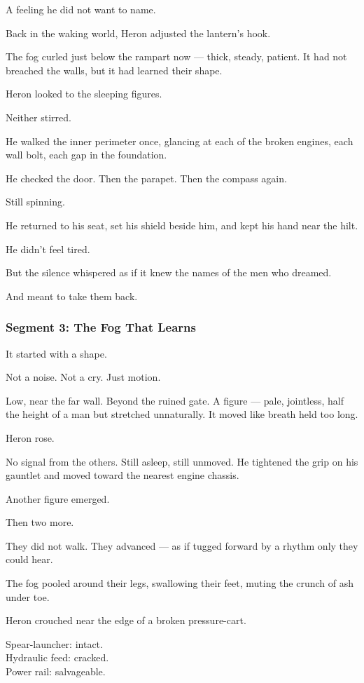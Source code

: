 \documentclass[9pt]{article}
\begin{document}
A feeling he did not want to name.

\bigskip

Back in the waking world, Heron adjusted the lantern’s hook.

The fog curled just below the rampart now — thick, steady, patient. It had not breached the walls, but it had learned their shape.

Heron looked to the sleeping figures.

Neither stirred.

He walked the inner perimeter once, glancing at each of the broken engines, each wall bolt, each gap in the foundation.

He checked the door. Then the parapet. Then the compass again.

Still spinning.

He returned to his seat, set his shield beside him, and kept his hand near the hilt.

He didn’t feel tired.

But the silence whispered as if it knew the names of the men who dreamed.

And meant to take them back.

\newpage

\subsubsection*{Segment 3: The Fog That Learns}

It started with a shape.

Not a noise. Not a cry. Just motion.

Low, near the far wall. Beyond the ruined gate. A figure — pale, jointless, half the height of a man but stretched unnaturally. It moved like breath held too long.

Heron rose.

No signal from the others. Still asleep, still unmoved. He tightened the grip on his gauntlet and moved toward the nearest engine chassis.

Another figure emerged.

Then two more.

They did not walk. They advanced — as if tugged forward by a rhythm only they could hear.

The fog pooled around their legs, swallowing their feet, muting the crunch of ash under toe.

Heron crouched near the edge of a broken pressure-cart.

Spear-launcher: intact. \\
Hydraulic feed: cracked. \\
Power rail: salvageable.
\end{document}
